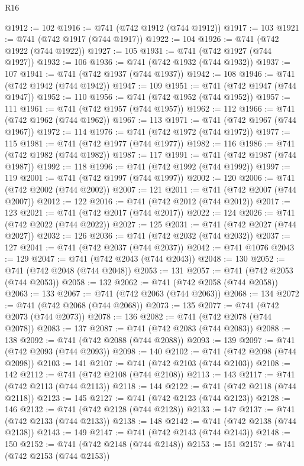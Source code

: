 \begin{lexlean}{R16}
\begin{coremodule}
@1912 := 102
@1916 := @741 (@742 @1912 (@744 @1912))
@1917 := 103
@1921 := @741 (@742 @1917 (@744 @1917))
@1922 := 104
@1926 := @741 (@742 @1922 (@744 @1922))
@1927 := 105
@1931 := @741 (@742 @1927 (@744 @1927))
@1932 := 106
@1936 := @741 (@742 @1932 (@744 @1932))
@1937 := 107
@1941 := @741 (@742 @1937 (@744 @1937))
@1942 := 108
@1946 := @741 (@742 @1942 (@744 @1942))
@1947 := 109
@1951 := @741 (@742 @1947 (@744 @1947))
@1952 := 110
@1956 := @741 (@742 @1952 (@744 @1952))
@1957 := 111
@1961 := @741 (@742 @1957 (@744 @1957))
@1962 := 112
@1966 := @741 (@742 @1962 (@744 @1962))
@1967 := 113
@1971 := @741 (@742 @1967 (@744 @1967))
@1972 := 114
@1976 := @741 (@742 @1972 (@744 @1972))
@1977 := 115
@1981 := @741 (@742 @1977 (@744 @1977))
@1982 := 116
@1986 := @741 (@742 @1982 (@744 @1982))
@1987 := 117
@1991 := @741 (@742 @1987 (@744 @1987))
@1992 := 118
@1996 := @741 (@742 @1992 (@744 @1992))
@1997 := 119
@2001 := @741 (@742 @1997 (@744 @1997))
@2002 := 120
@2006 := @741 (@742 @2002 (@744 @2002))
@2007 := 121
@2011 := @741 (@742 @2007 (@744 @2007))
@2012 := 122
@2016 := @741 (@742 @2012 (@744 @2012))
@2017 := 123
@2021 := @741 (@742 @2017 (@744 @2017))
@2022 := 124
@2026 := @741 (@742 @2022 (@744 @2022))
@2027 := 125
@2031 := @741 (@742 @2027 (@744 @2027))
@2032 := 126
@2036 := @741 (@742 @2032 (@744 @2032))
@2037 := 127
@2041 := @741 (@742 @2037 (@744 @2037))
@2042 := @741 @1076
@2043 := 129
@2047 := @741 (@742 @2043 (@744 @2043))
@2048 := 130
@2052 := @741 (@742 @2048 (@744 @2048))
@2053 := 131
@2057 := @741 (@742 @2053 (@744 @2053))
@2058 := 132
@2062 := @741 (@742 @2058 (@744 @2058))
@2063 := 133
@2067 := @741 (@742 @2063 (@744 @2063))
@2068 := 134
@2072 := @741 (@742 @2068 (@744 @2068))
@2073 := 135
@2077 := @741 (@742 @2073 (@744 @2073))
@2078 := 136
@2082 := @741 (@742 @2078 (@744 @2078))
@2083 := 137
@2087 := @741 (@742 @2083 (@744 @2083))
@2088 := 138
@2092 := @741 (@742 @2088 (@744 @2088))
@2093 := 139
@2097 := @741 (@742 @2093 (@744 @2093))
@2098 := 140
@2102 := @741 (@742 @2098 (@744 @2098))
@2103 := 141
@2107 := @741 (@742 @2103 (@744 @2103))
@2108 := 142
@2112 := @741 (@742 @2108 (@744 @2108))
@2113 := 143
@2117 := @741 (@742 @2113 (@744 @2113))
@2118 := 144
@2122 := @741 (@742 @2118 (@744 @2118))
@2123 := 145
@2127 := @741 (@742 @2123 (@744 @2123))
@2128 := 146
@2132 := @741 (@742 @2128 (@744 @2128))
@2133 := 147
@2137 := @741 (@742 @2133 (@744 @2133))
@2138 := 148
@2142 := @741 (@742 @2138 (@744 @2138))
@2143 := 149
@2147 := @741 (@742 @2143 (@744 @2143))
@2148 := 150
@2152 := @741 (@742 @2148 (@744 @2148))
@2153 := 151
@2157 := @741 (@742 @2153 (@744 @2153))

\end{coremodule}
\end{lexlean}
